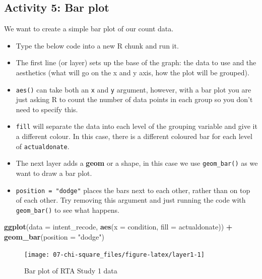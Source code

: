 \documentclass[]{book}
\newenvironment{Shaded}{\begin{snugshade}}{\end{snugshade}}
\newcommand{\DataTypeTok}[1]{\textcolor[rgb]{0.13,0.29,0.53}{#1}}
\newcommand{\KeywordTok}[1]{\textcolor[rgb]{0.13,0.29,0.53}{\textbf{#1}}}
\newcommand{\NormalTok}[1]{#1}
\newcommand{\OperatorTok}[1]{\textcolor[rgb]{0.81,0.36,0.00}{\textbf{#1}}}
\newcommand{\StringTok}[1]{\textcolor[rgb]{0.31,0.60,0.02}{#1}}
\providecommand{\tightlist}{%
  \setlength{\itemsep}{0pt}\setlength{\parskip}{0pt}}
\begin{document}
\hypertarget{bar}{%
\subsection{Activity 5: Bar plot}\label{bar}}

We want to create a simple bar plot of our count data.

\begin{itemize}
\tightlist
\item
  Type the below code into a new R chunk and run it.\\
\item
  The first line (or layer) sets up the base of the graph: the data to use and the aesthetics (what will go on the x and y axis, how the plot will be grouped).\\
\item
  \texttt{aes()} can take both an \texttt{x} and \texttt{y} argument, however, with a bar plot you are just asking R to count the number of data points in each group so you don't need to specify this.\\
\item
  \texttt{fill} will separate the data into each level of the grouping variable and give it a different colour. In this case, there is a different coloured bar for each level of \texttt{actualdonate}.\\
\item
  The next layer adds a \textbf{geom} or a shape, in this case we use \texttt{geom\_bar()} as we want to draw a bar plot.\\
\item
  \texttt{position\ =\ "dodge"} places the bars next to each other, rather than on top of each other. Try removing this argument and just running the code with \texttt{geom\_bar()} to see what happens.
\end{itemize}

\begin{Shaded}
\begin{Highlighting}[]
\KeywordTok{ggplot}\NormalTok{(}\DataTypeTok{data =}\NormalTok{ intent_recode, }\KeywordTok{aes}\NormalTok{(}\DataTypeTok{x =}\NormalTok{ condition, }\DataTypeTok{fill =}\NormalTok{ actualdonate)) }\OperatorTok{+}
\StringTok{  }\KeywordTok{geom_bar}\NormalTok{(}\DataTypeTok{position =} \StringTok{"dodge"}\NormalTok{)}
\end{Highlighting}
\end{Shaded}

\begin{figure}

{\centering \texttt{[image: 07-chi-square\_files/figure-latex/layer1-1]} 

}

\caption{Bar plot of RTA Study 1 data}\label{fig:layer1}
\end{figure}
\end{document}
